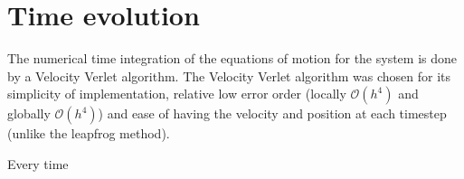 \section{Time evolution}
The numerical time integration of the equations of motion for the system is done by a Velocity Verlet algorithm. The Velocity Verlet algorithm was chosen for its simplicity of implementation, relative low error order (locally $\mathcal{O}(h^4)$ and globally $\mathcal{O}(h^4)$) and ease of having the velocity and position at each timestep (unlike the leapfrog method).

Every time